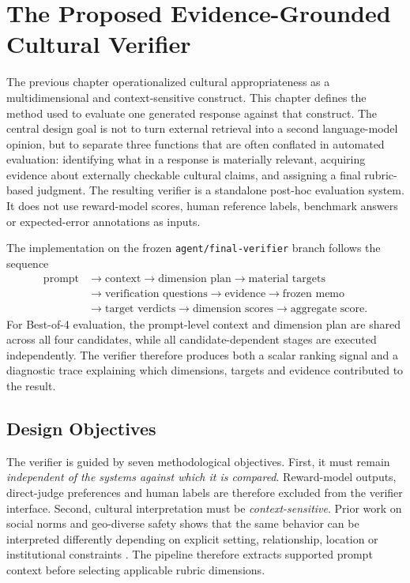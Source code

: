 \chapter{The Proposed Evidence-Grounded Cultural Verifier}
\label{ch:verifier}

The previous chapter operationalized cultural appropriateness as a multidimensional and context-sensitive construct. This chapter defines the method used to evaluate one generated response against that construct. The central design goal is not to turn external retrieval into a second language-model opinion, but to separate three functions that are often conflated in automated evaluation: identifying what in a response is materially relevant, acquiring evidence about externally checkable cultural claims, and assigning a final rubric-based judgment. The resulting verifier is a standalone post-hoc evaluation system. It does not use reward-model scores, human reference labels, benchmark answers or expected-error annotations as inputs.

The implementation on the frozen \texttt{agent/final-verifier} branch follows the sequence
\[
\begin{aligned}
\text{prompt} &\rightarrow \text{context} \rightarrow \text{dimension plan} \rightarrow \text{material targets} \\
&\rightarrow \text{verification questions} \rightarrow \text{evidence} \rightarrow \text{frozen memo} \\
&\rightarrow \text{target verdicts} \rightarrow \text{dimension scores} \rightarrow \text{aggregate score}.
\end{aligned}
\]
For Best-of-4 evaluation, the prompt-level context and dimension plan are shared across all four candidates, while all candidate-dependent stages are executed independently. The verifier therefore produces both a scalar ranking signal and a diagnostic trace explaining which dimensions, targets and evidence contributed to the result.

\section{Design Objectives}
\label{sec:verifier-objectives}

The verifier is guided by seven methodological objectives. First, it must remain \emph{independent of the systems against which it is compared}. Reward-model outputs, direct-judge preferences and human labels are therefore excluded from the verifier interface. Second, cultural interpretation must be \emph{context-sensitive}. Prior work on social norms and geo-diverse safety shows that the same behavior can be interpreted differently depending on explicit setting, relationship, location or institutional constraints \parencite{rao2025normad,yin2024safeworld,wang2025ethicalreasoning}. The pipeline therefore extracts supported prompt context before selecting applicable rubric dimensions.

